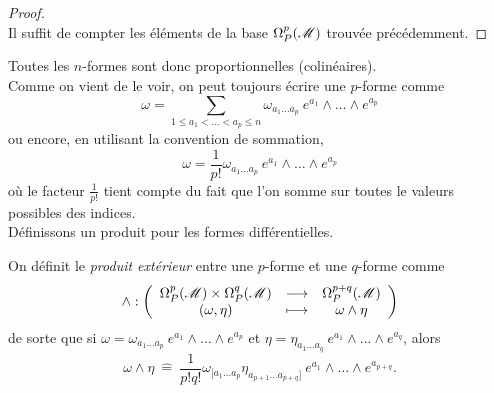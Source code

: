 \documentclass[a4paper,11pt]{report}
\begin{document}
            \begin{proof}${}$\\
                 Il suffit de compter les éléments de la base $\Omega_P^p(\mathscr{M})$ trouvée précédemment.
            \end{proof}
            
            Toutes les $n$-formes sont donc proportionnelles (colinéaires).\\
            
            Comme on vient de le voir, on peut toujours écrire une $p$-forme comme
            \begin{equation}
                \omega = \sum_{1\leq a_1<\dots<a_p\leq n} \omega_{a_1\dots a_p}~e^{a_1}\wedge\dots \wedge e^{a_p}
            \end{equation}
            ou encore, en utilisant la convention de sommation,
            \begin{equation}
                \omega = \frac{1}{p!} \omega_{a_1\dots a_p}~e^{a_1}\wedge\dots \wedge e^{a_p}
            \end{equation}
            où le facteur $\frac{1}{p!}$ tient compte du fait que l'on somme sur toutes le valeurs possibles des indices.\\
            
            Définissons un produit pour les formes différentielles.
            
            \begin{defn}
                On définit le \textit{produit extérieur} entre une $p$-forme et une $q$-forme comme
                \begin{equation}
                \wedge:\left(
                \begin{array}{ccc}
                    \Omega_P^p(\mathscr{M})\times \Omega_P^q(\mathscr{M}) & \longrightarrow & \Omega_P^{p+q}(\mathscr{M}) \\
                    (\omega,\eta) & \longmapsto & \omega\wedge\eta
                \end{array}
                \right)
                \end{equation}
                de sorte que si $\omega = \omega_{a_1\dots a_p}~e^{a_1}\wedge \dots\wedge e^{a_{p}}$ et $\eta = \eta_{a_1\dots a_q}~e^{a_1}\wedge \dots\wedge e^{a_{q}}$, alors
                \begin{equation}
                    \omega\wedge\eta ~\hat{=}~ \frac{1}{p!q!}\omega_{[a_1\dots a_p}\eta_{a_{p+1}\dots a_{p+q}]}~e^{a_1}\wedge \dots\wedge e^{a_{p+q}}.
                \end{equation}
            \end{defn}
            
\end{document}

